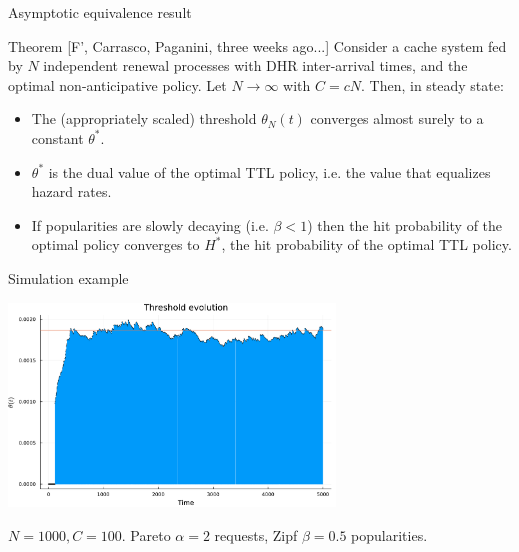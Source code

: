 \documentclass[aspectratio=169]{beamer}
\newenvironment*{myitem}[1][1.5em]{\begin{itemize}\setlength{\itemsep}{#1}}{\end{itemize}}
\begin{document}


\begin{frame}{Asymptotic equivalence result}

	\begin{block}{Theorem [F', Carrasco, Paganini, three weeks ago...]}
		Consider a cache system fed by $N$ independent renewal processes with DHR inter-arrival times, and the optimal non-anticipative policy. Let $N\to \infty$ with $C=cN$. Then, in steady state:

		\bigskip
		\begin{myitem}
			\item The (appropriately scaled) threshold $\theta_N(t)$ converges almost surely to a constant $\theta^*$.
			\item $\theta^*$ is the dual value of the optimal TTL policy, i.e. the value that equalizes hazard rates.
			\item If popularities are slowly decaying (i.e. $\beta<1$) then the hit probability of the optimal policy converges to $H^*$, the hit probability of the optimal TTL policy.
		\end{myitem}
	\end{block}
	
\end{frame}

\begin{frame}{Simulation example}
	\begin{center}
		\includegraphics[width=0.65\textwidth]{figuras/simulation_example.pdf}

		{\footnotesize $N=1000, C=100$. Pareto $\alpha=2$ requests, Zipf $\beta=0.5$  popularities.}
	\end{center}
\end{frame}
\end{document}
